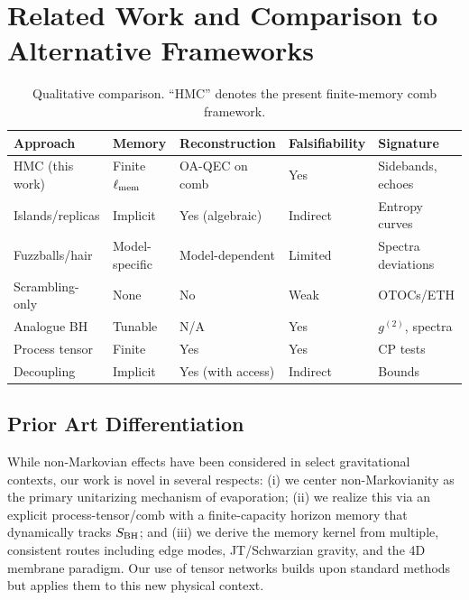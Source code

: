 \documentclass[aps,prd,preprint,onecolumn,superscriptaddress,nofootinbib,longbibliography,floatfix,11pt,showpacs,showkeys]{revtex4-2}
\newcommand{\HMC}{\textsc{HMC}\xspace}
\theoremstyle{plain}
\theoremstyle{definition}
\theoremstyle{remark}
\begin{document}
\section{Related Work and Comparison to Alternative Frameworks}
\label{sec:related-work}

\begin{table}[t]
\centering
\caption{Qualitative comparison. ``\HMC{}'' denotes the present finite-memory comb framework.}
\label{tab:rw-comparison}
\footnotesize
\begin{tabular*}{\textwidth}{@{\extracolsep{\fill}}lllll@{}}
\toprule
Approach & Memory & Reconstruction & Falsifiability & Signature \\
\midrule
\HMC{} (this work) & Finite $\ell_{\rm mem}$ & OA-QEC on comb & Yes & Sidebands, echoes \\
Islands/replicas & Implicit & Yes (algebraic) & Indirect & Entropy curves \\
Fuzzballs/hair & Model-specific & Model-dependent & Limited & Spectra deviations \\
Scrambling-only & None & No & Weak & OTOCs/ETH \\
Analogue BH & Tunable & N/A & Yes & $g^{(2)}$, spectra \\
Process tensor & Finite & Yes & Yes & CP tests \\
Decoupling & Implicit & Yes (with access) & Indirect & Bounds \\
\bottomrule
\end{tabular*}
\end{table}

\subsection{Prior Art Differentiation}
While non-Markovian effects have been considered in select gravitational contexts, our work is novel in several respects: (i) we center non-Markovianity as the primary unitarizing mechanism of evaporation; (ii) we realize this via an explicit process-tensor/comb with a finite-capacity horizon memory that dynamically tracks $S_{\rm BH}$; and (iii) we derive the memory kernel from multiple, consistent routes including edge modes, JT/Schwarzian gravity, and the 4D membrane paradigm. Our use of tensor networks builds upon standard methods~\cite{Schollwock:2011, Orus:2014} but applies them to this new physical context.
\end{document}
